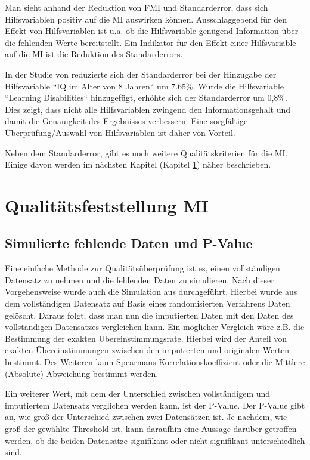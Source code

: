 Man sieht anhand der Reduktion von FMI und Standarderror, dass sich Hilfsvariablen positiv auf die MI auswirken können. Ausschlaggebend für den Effekt von Hilfsvariablen
ist u.a. ob die Hilfsvariable genügend Information über die fehlenden Werte bereitstellt. \autocite[1302]{Hughes2019} Ein Indikator für den Effekt einer Hilfsvariable auf 
die MI ist die Reduktion des Standarderrors. 

In der Studie von \textcite[]{Madley-Dowd2019} 
reduzierte sich der Standarderror bei der Hinzugabe der Hilfsvariable 
``IQ im Alter von 8 Jahren`` um 7.65\%. Wurde die Hilfsvariable ``Learning Disabilities``  hinzugefügt, erhöhte sich der Standarderror um 0,8\%. \autocite[71]{Madley-Dowd2019} 
Dies zeigt, dass nicht alle Hilfsvariablen zwingend den Informationsgehalt und damit die Genauigkeit des Ergebnisses verbessern. 
Eine sorgfältige Überprüfung/Auswahl von Hilfsvariablen ist daher von Vorteil. 

Neben dem Standarderror, gibt es noch weitere Qualitätskriterien für die MI. Einige davon werden im nächsten Kapitel
(Kapitel \ref{section:qualtity}) näher beschrieben.


\section{Qualitätsfeststellung MI}
\label{section:qualtity}

\subsection{Simulierte fehlende Daten und P-Value}

Eine einfache Methode zur Qualitätsüberprüfung ist es, einen vollständigen Datensatz zu nehmen und die fehlenden Daten zu 
simulieren. Nach dieser Vorgehensweise wurde auch die Simulation aus \textcite[]{Young-Saver2018} durchgeführt. Hierbei wurde 
aus dem vollständigen Datensatz auf Basis eines randomisierten Verfahrens Daten gelöscht. Daraus folgt, dass man nun die 
imputierten Daten mit den Daten des vollständigen Datensatzes vergleichen kann. Ein möglicher Vergleich wäre z.B. die 
Bestimmung der exakten Übereinstimmungsrate. Hierbei wird der Anteil von exakten Übereinstimmungen zwischen den imputierten 
und originalen Werten bestimmt. Des Weiteren kann Spearmans Korrelationskoeffizient oder die Mittlere (Absolute) Abweichung 
bestimmt werden. \autocite[3664]{Young-Saver2018} 

Ein weiterer Wert, mit dem der Unterschied zwischen vollständigem und imputiertem Datensatz verglichen werden kann, ist der P-Value.
Der P-Value gibt an, wie groß der Unterschied zwischen zwei Datensätzen ist. Je nachdem, wie groß der gewählte Threshold ist,
kann daraufhin eine Aussage darüber getroffen werden, ob die beiden Datensätze signifikant oder nicht signifikant unterschiedlich
sind. 

